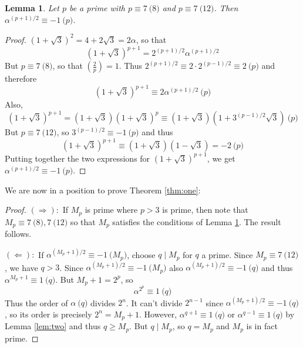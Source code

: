 \documentclass[12pt]{article}
\newcommand{\Leg}[2]{\left(\frac{#1}{#2}\right)}
\newtheorem{lem}[thm]{Lemma}
\begin{document}
\begin{lem} \label{lem:three}Let $p$ be a prime with $p\equiv 7\pod 8$ and $p\equiv 7\pod {12}$. Then $\alpha^{(p+1)/2}\equiv -1\pod p$.
\end{lem}
\begin{proof}
$(1+\sqrt{3})^2 = 4+2\sqrt{3} = 2\alpha$, so that
\[
  (1+\sqrt{3})^{p+1} = 2^{(p+1)/2}\alpha^{(p+1)/2}
\]
But $p\equiv 7\pod 8$, so that $\Leg{2}{p}=1$. Thus $2^{(p+1)/2} \equiv 2\cdot 2^{(p-1)/2} \equiv 2 \pod p$ and therefore
\[
  (1+\sqrt{3})^{p+1} \equiv 2\alpha^{(p+1)/2}\pod p
\]
Also,
\[
  (1+\sqrt{3})^{p+1} = (1+\sqrt{3})(1+\sqrt{3})^p \equiv (1+\sqrt{3})(1+3^{(p-1)/2}\sqrt{3})\pod p
\]
But $p\equiv 7\pod {12}$, so $3^{(p-1)/2}\equiv -1\pod p$ and thus
\[
  (1+\sqrt{3})^{p+1} \equiv (1+\sqrt{3})(1-\sqrt{3}) = -2\pod p
\]
Putting together the two expressions for $(1+\sqrt{3})^{p+1}$, we get $\alpha^{(p+1)/2}\equiv -1\pod p$.
\end{proof}

We are now in a position to prove Theorem \ref{thm:one}:
\begin{proof}
$(\Rightarrow):$ If $M_p$ is prime where $p>3$ is prime, then note that $M_p\equiv 7\pod 8, 7\pod 12$ so that $M_p$ satisfies the conditions of Lemma \ref{lem:three}. The result follows.

$(\Leftarrow):$ If $\alpha^{(M_p+1)/2} \equiv -1\pod{M_p}$, choose $q\mid M_p$ for $q$ a prime. Since $M_p\equiv 7\pod 12$, we have $q>3$. Since $\alpha^{(M_p+1)/2}\equiv -1\pod{M_p}$ also $\alpha^{(M_p+1)/2}\equiv -1\pod q$ and thus $\alpha^{M_p+1}\equiv 1\pod q$. But $M_p+1=2^p$, so
\[
  \alpha^{2^p} \equiv 1\pod q
\]
Thus the order of $\alpha\pod q$ divides $2^n$. It can't divide $2^{n-1}$ since $\alpha^{(M_p+1)/2} \equiv -1\pod q$, so its order is precisely $2^n = M_p+1$. However, $\alpha^{q+1}\equiv 1\pod q$ or $\alpha^{q-1}\equiv 1\pod q$ by Lemma \ref{lem:two} and thus $q\geq M_p$. But $q\mid M_p$, so $q=M_p$ and $M_p$ is in fact prime.
\end{proof}
\end{document}
